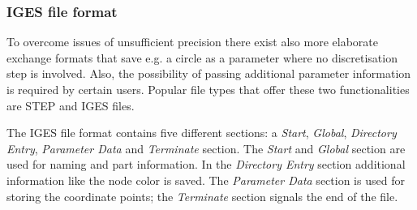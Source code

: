 \subsubsection{IGES file format}
To overcome issues of unsufficient precision there exist also more elaborate exchange formats that save e.g. a circle as a parameter where no discretisation step is involved. Also, the possibility of passing additional parameter information is required by certain users. Popular file types that offer these two functionalities are STEP and IGES files. 

The IGES file format contains five different sections: a \emph{Start}, \emph{Global}, \emph{Directory Entry}, \emph{Parameter Data} and \emph{Terminate} section. The \emph{Start} and \emph{Global} section are used for naming and part information. In the \emph{Directory Entry} section additional information like the node color is saved. The \emph{Parameter Data} section is used for storing the coordinate points; the \emph{Terminate} section signals the end of the file. 
